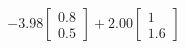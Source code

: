 \documentclass[preview]{standalone}
\begin{document}
\begin{align*}
-3.98 \begin{bmatrix} 0.8 \\ 0.5 \end{bmatrix} + 2.00 \begin{bmatrix} 1 \\ 1.6 \end{bmatrix}
\end{align*}
\end{document}
